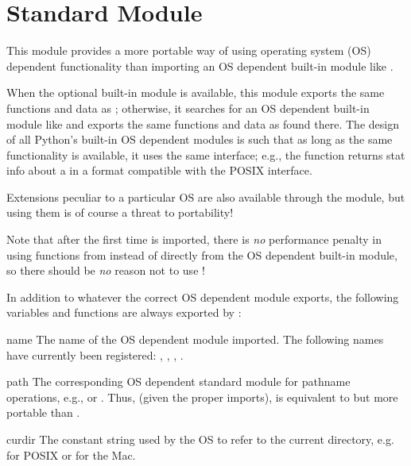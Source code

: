 \section{Standard Module }

This module provides a more portable way of using operating system
(OS) dependent functionality than importing an OS dependent built-in
module like .

When the optional built-in module  is available, this
module exports the same functions and data as ; otherwise,
it searches for an OS dependent built-in module like  and
exports the same functions and data as found there.  The design of all
Python's built-in OS dependent modules is such that as long as the same
functionality is available, it uses the same interface; e.g., the
function  returns stat info about a  in a
format compatible with the POSIX interface.

Extensions peculiar to a particular OS are also available through the
 module, but using them is of course a threat to portability!

Note that after the first time  is imported, there is \emph{no}
performance penalty in using functions from  instead of
directly from the OS dependent built-in module, so there should be
\emph{no} reason not to use !

In addition to whatever the correct OS dependent module exports, the
following variables and functions are always exported by :

\renewcommand{\indexsubitem}{(in module os)}

\begin{datadesc}{name}
The name of the OS dependent module imported.  The following names
have currently been registered: , ,
, .
\end{datadesc}

\begin{datadesc}{path}
The corresponding OS dependent standard module for pathname
operations, e.g.,  or .  Thus, (given
the proper imports),  is equivalent to but
more portable than .
\end{datadesc}

\begin{datadesc}{curdir}
The constant string used by the OS to refer to the current directory,
e.g.  for POSIX or  for the Mac.
\end{datadesc}

